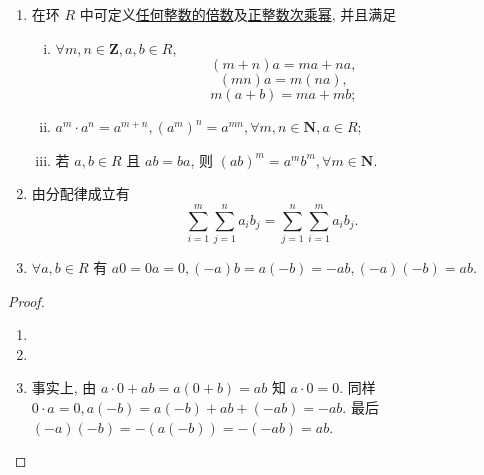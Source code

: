 \documentclass[../../main.tex]{subfiles}
\begin{document}
\begin{theorem}[环的基本性质]\label{theorem:环的基本性质}
\begin{enumerate}[(1)]
\item 在环 \( R \) 中可定义\hyperref[definition:倍数的定义]{任何整数的倍数}及\hyperref[definition:n次乘幂]{正整数次乘幂}, 并且满足
\begin{enumerate}[(i)]
\item \( \forall m,n \in \mathbf{Z}, a,b \in R \),
\[
(m + n)a = ma + na,
\]
\[
(mn)a = m(na),
\]
\[
m(a + b) = ma + mb;
\]
\item \( a^m \cdot a^n = a^{m+n}, (a^m)^n = a^{mn}, \forall m,n \in \mathbf{N}, a \in R \);
\item 若 \( a,b \in R \) 且 \( ab = ba \), 则 \( (ab)^m = a^m b^m, \forall m \in \mathbf{N} \).
\end{enumerate}

\item 由分配律成立有
\[
\sum_{i=1}^m \sum_{j=1}^n a_i b_j = \sum_{j=1}^n \sum_{i=1}^m a_i b_j.
\]

\item \( \forall a,b \in R \) 有 \( a0 = 0a = 0, (-a)b = a(-b) = -ab, (-a)(-b) = ab \).
\end{enumerate}
\end{theorem}
\begin{proof}
\begin{enumerate}[(1)]
\item 

\item 

\item 事实上, 由 \( a \cdot 0 + ab = a(0 + b) = ab \) 知 \( a \cdot 0 = 0 \). 同样 \( 0 \cdot a = 0, a(-b) = a(-b) + ab + (-ab) = -ab \). 最后 \( (-a)(-b) = -(a(-b)) = -(-ab) = ab \).
\end{enumerate}

\end{proof}
\end{document}

